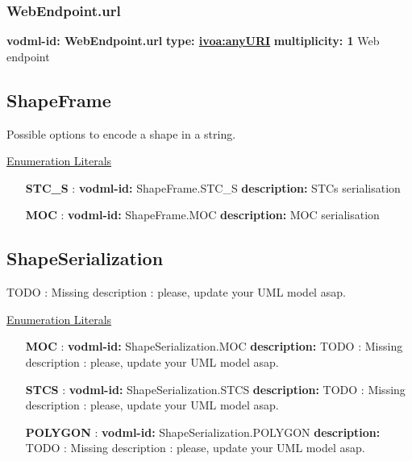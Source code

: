 {    \subsubsection{WebEndpoint.url}
      \textbf{vodml-id: WebEndpoint.url} \newline
      \textbf{type: \hyperref[sect:ivoa]{ivoa:anyURI}} \newline
      \textbf{multiplicity: 1} \newline 
      Web endpoint

  \subsection{ShapeFrame}
  \label{sect:ShapeFrame}

  Possible options to encode a shape in a string.

  \noindent \underline{Enumeration Literals}
  \vspace{-\parsep}
  \small
  \begin{itemize}
  
    \item[\textbf{STC\_S}]: \textbf{vodml-id:} ShapeFrame.STC\_S \newline
          \textbf{description:} STCs serialisation
    \item[\textbf{MOC}]: \textbf{vodml-id:} ShapeFrame.MOC \newline
          \textbf{description:} MOC serialisation
  \end{itemize}
  \normalsize


  \subsection{ShapeSerialization}
  \label{sect:ShapeSerialization}

  TODO : Missing description : please, update your UML model asap.

  \noindent \underline{Enumeration Literals}
  \vspace{-\parsep}
  \small
  \begin{itemize}
  
    \item[\textbf{MOC}]: \textbf{vodml-id:} ShapeSerialization.MOC \newline
          \textbf{description:} TODO : Missing description : please, update your UML model asap.
    \item[\textbf{STCS}]: \textbf{vodml-id:} ShapeSerialization.STCS \newline
          \textbf{description:} TODO : Missing description : please, update your UML model asap.
    \item[\textbf{POLYGON}]: \textbf{vodml-id:} ShapeSerialization.POLYGON \newline
          \textbf{description:} TODO : Missing description : please, update your UML model asap.
  \end{itemize}
  \normalsize


}
